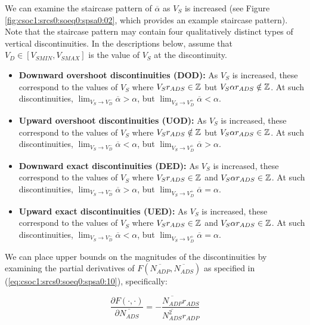 We can examine the staircase pattern of $\overline{\alpha}$ as 
$V_S$ is increased (see Figure \ref{fig:csoc1:srcs0:soeq0:spsa0:02},
which provides an example staircase pattern).  Note that the staircase
pattern may contain four qualitatively
distinct types of vertical discontinuities.  In the descriptions below,
assume that $V_D \in [V_{SMIN}, V_{SMAX}]$ is the value of
$V_S$ at the discontinuity.

\begin{itemize}
\item \textbf{Downward overshoot discontinuities (DOD):}
      As $V_S$ is increased, these correspond to the values
      of $V_S$ where $V_S r_{ADS} \in {\mathbb{Z}}$ but
      $V_S \alpha r_{ADS} \notin {\mathbb{Z}}$.  At such 
      discontinuities, 
      $\lim_{V_S \rightarrow V_D^-}\overline{\alpha} > \alpha$,
      but 
      $\lim_{V_S \rightarrow V_D^+}\overline{\alpha} < \alpha$.
\item \textbf{Upward overshoot discontinuities (UOD):}
      As $V_S$ is increased, these correspond to the values
      of $V_S$ where $V_S r_{ADS} \notin {\mathbb{Z}}$ but
      $V_S \alpha r_{ADS} \in {\mathbb{Z}}$.  At such 
      discontinuities, 
      $\lim_{V_S \rightarrow V_D^-}\overline{\alpha} < \alpha$,
      but 
      $\lim_{V_S \rightarrow V_D^+}\overline{\alpha} > \alpha$.
\item \textbf{Downward exact discontinuities (DED):}
      As $V_S$ is increased, these correspond to the values
      of $V_S$ where $V_S r_{ADS} \in {\mathbb{Z}}$ and
      $V_S \alpha r_{ADS} \in {\mathbb{Z}}$.  At such 
      discontinuities, 
      $\lim_{V_S \rightarrow V_D^-}\overline{\alpha} > \alpha$,
      but 
      $\lim_{V_S \rightarrow V_D^+}\overline{\alpha} = \alpha$.
\item \textbf{Upward exact discontinuities (UED):}
      As $V_S$ is increased, these correspond to the values
      of $V_S$ where $V_S r_{ADS} \in {\mathbb{Z}}$ and
      $V_S \alpha r_{ADS} \in {\mathbb{Z}}$.  At such 
      discontinuities, 
      $\lim_{V_S \rightarrow V_D^-}\overline{\alpha} < \alpha$,
      but 
      $\lim_{V_S \rightarrow V_D^+}\overline{\alpha} = \alpha$.
\end{itemize}

We can place upper bounds on the magnitudes of the discontinuities
by examining the partial derivatives of
$F(\overline{N_{ADP}}, \overline{N_{ADS}})$ as specified in
(\ref{eq:csoc1:srcs0:soeq0:spsa0:10}), specifically:

\begin{equation}
\label{eq:csoc1:srcs0:soeq0:spsa0:11}
\frac{\partial{}F(\cdot{},\cdot{})}{\partial \overline{N_{ADS}}}
= 
-
\frac{\overline{N_{ADP}} r_{ADS}}{\overline{N_{ADS}^2} r_{ADP}}
\end{equation}

